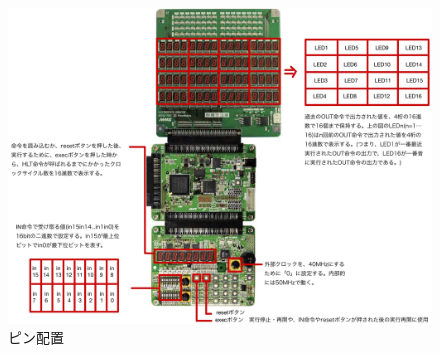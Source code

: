 \documentclass[a4j,titlepage]{jarticle}
\begin{document}
\begin{figure}[H]
    \begin{center}
    \includegraphics[scale = 0.12]{UI.jpg}
    \end{center}
    \caption{ピン配置}
    \label{UI}
\end{figure}
\end{document}
